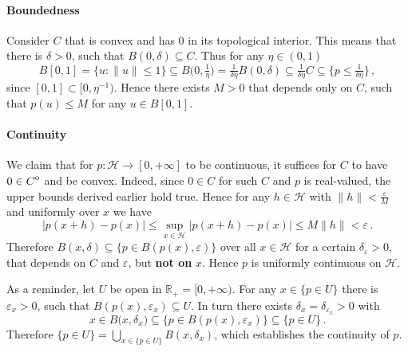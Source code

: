 \documentclass[a4paper]{article}
\newcommand{\Hcal}{\mathcal{H}}
\newcommand{\real}{\mathbb{R}}
\newcommand{\interior}[1]{%
  {\kern0pt#1}^{\mathrm{o}}%
}
\newcommand{\Tcal}{\mathcal{T}}
\begin{document}

\paragraph{Boundedness} %
\label{par:boundedness}

Consider $C$ that is convex and has $0$ in its topological interior. This means that
there is $\delta > 0$, such that $B(0, \delta) \subseteq C$. Thus for any $\eta \in
(0, 1)$
\begin{equation*}
  B[0, 1]
    = \{u\colon \|u\| \leq 1\}
    \subseteq B\bigl( 0, \tfrac1\eta \bigr)
    = \tfrac1{\delta \eta} B(0, \delta)
    \subseteq \tfrac1{\delta \eta} C
    \subseteq \bigl\{p \leq \tfrac1{\delta\eta} \bigr\}
    \,,
\end{equation*}
since $[0, 1] \subset [0, \eta^{-1})$. Hence there exists $M > 0$ that depends only
on $C$, such that $p(u) \leq M$ for any $u \in B[0, 1]$.


\paragraph{Continuity} %
\label{par:continuity}

We claim that for $p\colon \Hcal \to [0, +\infty]$ to be continuous, it suffices
for $C$ to have $0\in \interior{C}$ and be convex. Indeed, since $0\in C$ for such
$C$ and $p$ is real-valued, the upper bounds derived earlier hold true. Hence for
any $h \in \Hcal$ with $\|h\| < \tfrac\varepsilon{M}$ and uniformly over $x$ we have
\begin{equation*}
  \bigl\lvert p(x + h) - p(x) \bigr\rvert
    \leq
      \sup_{x\in \Hcal}
        \bigl\lvert p(x + h) - p(x) \bigr\rvert
    \leq M \| h \| < \varepsilon
      \,.
\end{equation*}
Therefore $B(x, \delta) \subseteq \bigl\{ p\in B(p(x), \varepsilon)\bigr\}$ over
all $x\in \Hcal$ for a certain $\delta_\varepsilon > 0$, that depends on $C$ and
$\varepsilon$, but {\bf not on} $x$. Hence $p$ is uniformly continuous on $\Hcal$.

As a reminder, let $U$ be open in $\real_+ = [0, +\infty)$. For any $x\in \{p\in U\}$
there is $\varepsilon_x > 0$, such that $B(p(x), \varepsilon_x) \subseteq U$. In
turn there exists $\delta_x = \delta_{\varepsilon_x} > 0$ with
\begin{equation*}
  x \in B\bigl(x, \delta_x\bigr)
    \subseteq \bigl\{ p\in B(p(x), \varepsilon_x)\bigr\}
    \subseteq \{ p \in U \}
    \,.
\end{equation*}
Therefore $\{ p \in U \} = \bigcup_{x\in \{ p \in U \}} B(x, \delta_x)$, which
establishes the continuity of $p$.
\end{document}
